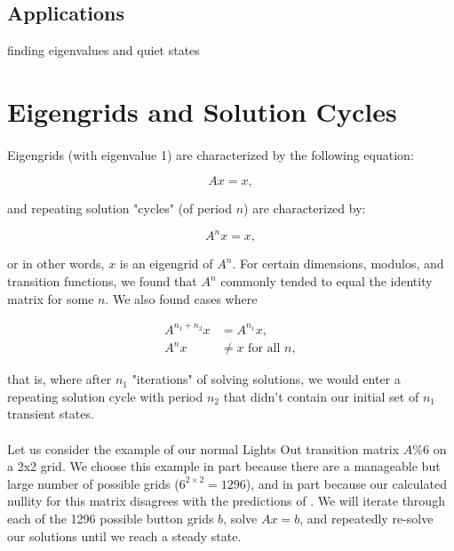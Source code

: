 \documentclass[11pt]{article}
\begin{document}
\subsection*{Applications}
finding eigenvalues and quiet states



\section*{Eigengrids and Solution Cycles}

\paragraph{} Eigengrids (with eigenvalue 1) are characterized by the following equation:

\begin{equation}
Ax = x,
\end{equation}

\noindent and repeating solution "cycles" (of period $n$) are characterized by:

\begin{equation}
A^nx = x,
\end{equation}

\noindent or in other words, $x$ is an eigengrid of $A^n$. For certain dimensions, modulos, and transition functions, we found that $A^n$ commonly tended to equal the identity matrix for some $n$. We also found cases where

\begin{equation}
\begin{split}
  A^{n_1 + n_2}x & = A^{n_1}x,\\
  A^{n}x & \neq x \text{ for all } n,
\end{split}
\end{equation}

\noindent that is, where after $n_1$ "iterations" of solving solutions, we would enter a repeating solution cycle with period $n_2$ that didn't contain our initial set of $n_1$ transient states.

\paragraph{} Let us consider the example of our normal Lights Out transition matrix $A \% 6$ on a 2x2 grid. We choose this example in part because there are a manageable but large number of possible grids ($6^{2 \times 2} = 1296$), and in part because our calculated nullity for this matrix disagrees with the predictions of \cite{involve}. We will iterate through each of the 1296 possible button grids $b$, solve $Ax=b$, and repeatedly re-solve our solutions until we reach a steady state.
\end{document}
